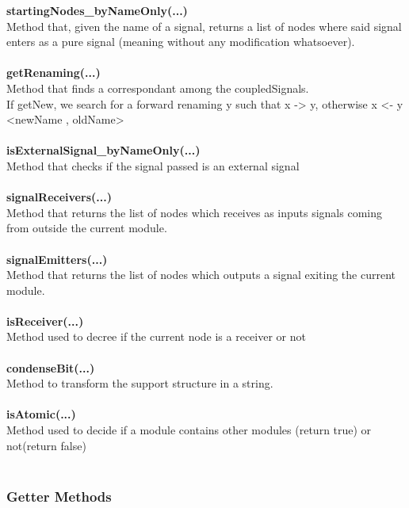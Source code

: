 \documentclass{article}
\begin{document}
\textbf{startingNodes\_byNameOnly(...)}\\
Method that, given the name of a signal, returns a list of nodes where said signal enters as a pure signal (meaning without any modification whatsoever).\\\\

\textbf{getRenaming(...)}\\
Method that finds a correspondant among the coupledSignals.\\
If getNew, we search for a forward renaming y such that x -> y, otherwise x <- y	<newName , oldName>\\\\

\textbf{isExternalSignal\_byNameOnly(...)}\\
Method that checks if the signal passed is an external signal\\\\

\textbf{signalReceivers(...)}\\
Method that returns the list of nodes which receives as inputs signals coming from outside the current module.\\\\

\textbf{signalEmitters(...)}\\
Method that returns the list of nodes which outputs a signal exiting the current module.\\\\

\textbf{isReceiver(...)}\\
Method used to decree if the current node is a receiver or not\\\\

\textbf{condenseBit(...)}\\
Method to transform the support structure in a string.\\\\

\textbf{isAtomic(...)}\\
Method used to decide if a module contains other modules (return true) or not(return false)\\\\

\subsubsection{Getter Methods}
\end{document}
